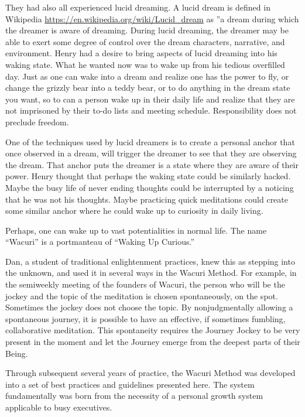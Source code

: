 \documentclass[12pt]{book}
\begin{document}
					
They had also all experienced lucid dreaming. A lucid dream is defined
in Wikipedia \url{https://en.wikipedia.org/wiki/Lucid_dream} as ”a
dream during which the dreamer is aware of dreaming. During lucid
dreaming, the dreamer may be able to exert some degree of control over
the dream characters, narrative, and environment. Henry had a desire
to bring aspects of lucid dreaming into his waking state. What he
wanted now was to wake up from his tedious overfilled day. Just as one
can wake into a dream and realize one has the power to fly, or change
the grizzly bear into a teddy bear, or to do anything in the dream
state you want, so to can a person wake up in their daily life and
realize that they are not imprisoned by their to-do lists and meeting
schedule. Responsibility does not preclude freedom.
					
One of the techniques used by lucid dreamers is to create a personal
anchor that once observed in a dream, will trigger the dreamer to see
that they are observing the dream. That anchor puts the dreamer is a
state where they are aware of their power. Henry thought that perhaps
the waking state could be similarly hacked. Maybe the busy life of
never ending thoughts could be interrupted by a noticing that he was
not his thoughts. Maybe practicing quick meditations could create some
similar anchor where he could wake up to curiosity in daily living.
					
Perhaps, one can wake up to vast potentialities in normal life. The
name ``Wacuri'' is a portmanteau of ``Waking Up Curious.''
					
Dan, a student of traditional enlightenment practices, knew this as
stepping into the unknown, and used it in several ways in the Wacuri
Method. For example, in the semiweekly meeting of the founders of
Wacuri, the person who will be the jockey and the topic of the
meditation is chosen spontaneously, on the spot. Sometimes the jockey
does not choose the topic. By nonjudgmentally allowing a spontaneous
journey, it is possible to have an effective, if sometimes fumbling,
collaborative meditation. This spontaneity requires the Journey Jockey
to be very present in the moment and let the Journey emerge from the
deepest parts of their Being.
					
Through subsequent several years of practice, the Wacuri Method was
developed into a set of best practices and guidelines presented
here. The system fundamentally was born from the necessity of a
personal growth system applicable to busy executives.
				
\end{document}
